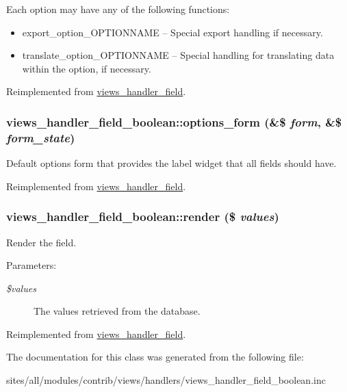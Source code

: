  Each option may have any of the following functions:\begin{itemize}
\item export\_\-option\_\-OPTIONNAME -- Special export handling if necessary.\item translate\_\-option\_\-OPTIONNAME -- Special handling for translating data within the option, if necessary. \end{itemize}


Reimplemented from \hyperlink{classviews__handler__field_64c69a8a3697603f8283405071c25b76}{views\_\-handler\_\-field}.\hypertarget{classviews__handler__field__boolean_3addce6b85348a630627f348907082e3}{
\subsubsection[{options\_\-form}]{\setlength{\rightskip}{0pt plus 5cm}views\_\-handler\_\-field\_\-boolean::options\_\-form (\&\$ {\em form}, \/  \&\$ {\em form\_\-state})}}
\label{classviews__handler__field__boolean_3addce6b85348a630627f348907082e3}


Default options form that provides the label widget that all fields should have. 

Reimplemented from \hyperlink{classviews__handler__field_0435d161922b7b4b84f02a2e79bb947a}{views\_\-handler\_\-field}.\hypertarget{classviews__handler__field__boolean_d7d7fc1b29362cee6b2f043e029052af}{
\subsubsection[{render}]{\setlength{\rightskip}{0pt plus 5cm}views\_\-handler\_\-field\_\-boolean::render (\$ {\em values})}}
\label{classviews__handler__field__boolean_d7d7fc1b29362cee6b2f043e029052af}


Render the field.

\begin{Desc}
\item[Parameters:]
\begin{description}
\item[{\em \$values}]The values retrieved from the database. \end{description}
\end{Desc}


Reimplemented from \hyperlink{classviews__handler__field_82ff951c5e9ceb97b2eab86f880cbc1e}{views\_\-handler\_\-field}.

The documentation for this class was generated from the following file:\begin{CompactItemize}
\item 
sites/all/modules/contrib/views/handlers/views\_\-handler\_\-field\_\-boolean.inc\end{CompactItemize}

